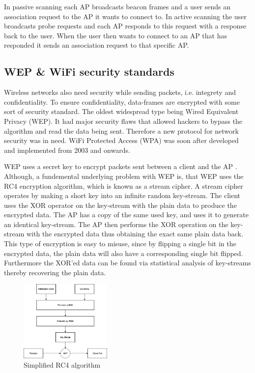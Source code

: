 In passive scanning each AP broadcasts beacon frames and a user sends an association request to the AP it wants to connect to. In active scanning the user broadcasts probe requests and each AP responds to this request with a response back to the user. When the user then wants to connect to an AP that has responded it sends an association request to that specific AP. 

\subsection{WEP \& WiFi security standards}
Wireless networks also need security while sending packets, i.e. integrety and confidentiality. To ensure confidentiality, data-frames are encrypted with some sort of security standard. The oldest widespread type being Wired Equivalent Privacy (WEP). It had major security flaws that allowed hackers to bypass the algorithm and read the data being sent\cite{WEP1}. Therefore a new protocol for network security was in need. WiFi Protected Access (WPA) was soon after developed and implemented from 2003 and onwards\cite{WEP3}. 

WEP uses a secret key to encrypt packets sent between a client and the AP \cite{WEP2}. Although, a fundemental underlying problem with WEP is, that WEP uses the RC4 encryption algorithm, which is known as a stream cipher. A stream cipher operates by making a short key into an infinite random key-stream. The client uses the XOR operator on the key-stream with the plain data to produce the encrypted data. The AP has a copy of the same used key, and uses it to generate an identical key-stream. The AP then performs the XOR operation on the key-stream with the encrypted data thus obtaining the exact same plain data back. This type of encryption is easy to misuse, since by flipping a single bit in the encrypted data, the plain data will also have a corresponding single bit flipped. Furthermore the XOR'ed data can be found via statistical analysis of key-streams thereby recovering the plain data.

\begin{figure}[!htbp]
    \centering
    \includegraphics[width=0.4\textwidth]{Latex-Files/Billeder/RC4.png}
    \caption{Simplified RC4 algorithm \cite{geeks}}
    \label{RC4}
\end{figure}


